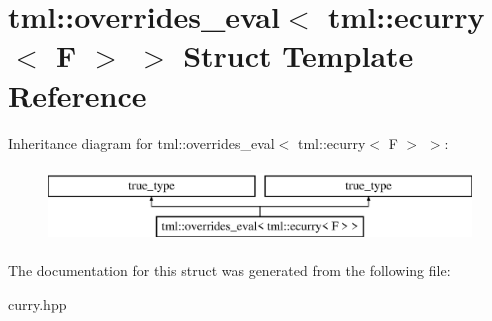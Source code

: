 \hypertarget{structtml_1_1overrides__eval_3_01tml_1_1ecurry_3_01F_01_4_01_4}{\section{tml\+:\+:overrides\+\_\+eval$<$ tml\+:\+:ecurry$<$ F $>$ $>$ Struct Template Reference}
\label{structtml_1_1overrides__eval_3_01tml_1_1ecurry_3_01F_01_4_01_4}
}
Inheritance diagram for tml\+:\+:overrides\+\_\+eval$<$ tml\+:\+:ecurry$<$ F $>$ $>$\+:\begin{figure}[H]
\begin{center}
\leavevmode
\includegraphics[height=2.000000cm]{structtml_1_1overrides__eval_3_01tml_1_1ecurry_3_01F_01_4_01_4}
\end{center}
\end{figure}


The documentation for this struct was generated from the following file\+:\begin{DoxyCompactItemize}
\item 
curry.\+hpp\end{DoxyCompactItemize}
